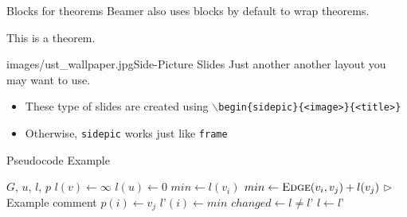 \documentclass[]{beamer}
\newcommand{\hrefcol}[2]{\textcolor{uihteal}{\href{#1}{#2}}}
\begin{document}
\begin{frame}[fragile]{Blocks for theorems}
Beamer also uses blocks by default to wrap theorems.
\begin{theorem} This is a theorem. \end{theorem}
\end{frame}


\begin{sidepic}{images/ust_wallpaper.jpg}{Side-Picture Slides}
Just another another layout you may want to use.
\begin{itemize}
\item These type of slides are created using \texttt{$\backslash$begin\{sidepic\}\{<image>\}\{<title>\}}
\item Otherwise, \texttt{sidepic} works just like \texttt{frame}
\end{itemize}
\end{sidepic}


\renewcommand{\algorithmicrequire}{\textbf{Input:}}
\renewcommand{\algorithmicensure}{\textbf{Output:}}
\newcommand*\CALL[2]{\textsc{#1}(#2)}
\newcommand*\ANNOTATE[1]{\hfill\(\triangleright\) #1}%

\begin{frame}[fragile]{Pseudocode Example}
\begin{algorithm}[H]
\fontsize{8}{1}\selectfont
\caption{Bellman-Kalaba (adapted from \hrefcol{https://www.ctan.org/tex-archive/macros/latex/contrib/algorithmicx/algorithmicx.pdf}{algorithmicx documentation}).}
\begin{algorithmic}
\REQUIRE $G$, $u$, $l$, $p$
    \STATE $l(v) \leftarrow \infty$
\ENDFOR
\STATE $l(u) \leftarrow 0$
\REPEAT
        \STATE $min \leftarrow l(v_i)$
            \IF {$min > \CALL{Edge}{v_i, v_j} + l(v_j)$}
                \STATE $min \leftarrow \CALL{Edge}{v_i, v_j} + l(v_j)$ \ANNOTATE{Example comment}
                \STATE $p(i) \leftarrow v_j$
            \ENDIF
        \ENDFOR
        \STATE $l’(i) \leftarrow min$
    \ENDFOR
    \STATE $changed \leftarrow l \not= l’$
    \STATE $l \leftarrow l’$
\end{algorithmic}
\end{algorithm}
\end{frame}


\end{document}
